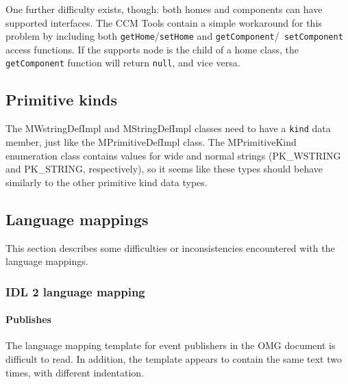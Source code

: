 One further difficulty exists, though: both homes and components can have
supported interfaces. The CCM Tools contain a simple workaround for this problem
by including both {\tt getHome}/{\tt setHome} and {\tt getComponent}/{\tt
setComponent} access functions. If the supports node is the child of a home
class, the {\tt getComponent} function will return {\tt null}, and vice versa.

\subsection{Primitive kinds}

The MWstringDefImpl and MStringDefImpl classes need to have a {\tt kind} data
member, just like the MPrimitiveDefImpl class. The MPrimitiveKind enumeration
class contains values for wide and normal strings (PK\_WSTRING and PK\_STRING,
respectively), so it seems like these types should behave similarly to the other
primitive kind data types.

\subsection{Language mappings}

This section describes some difficulties or inconsistencies encountered with the
language mappings.

\subsubsection{IDL 2 language mapping}

\paragraph{Publishes}

The language mapping template for event publishers in the OMG document is
difficult to read. In addition, the template appears to contain the same text
two times, with different indentation.

